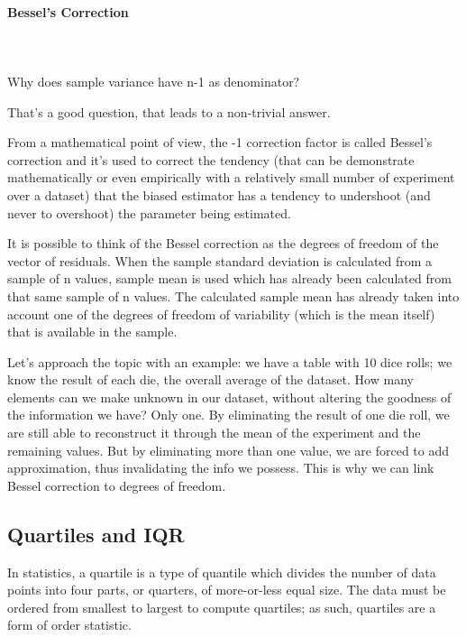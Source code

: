 \documentclass{article}
\begin{document}
\paragraph{Bessel's Correction}\mbox{} \\ 
\mbox{} \\

Why does sample variance have n-1 as denominator?

That’s a good question, that leads to a non-trivial answer. 

From a mathematical point of view, the -1 correction factor is called Bessel’s correction and it’s used to correct the tendency (that can be demonstrate mathematically or even empirically with a relatively small number of experiment over a dataset) that the biased estimator has a tendency to undershoot (and never to overshoot) the parameter being estimated.  

It is possible to think of the Bessel correction as the degrees of freedom of the vector of residuals. When the sample standard deviation is calculated from a sample of n values, sample mean is used which has already been calculated from that same sample of n values. The calculated sample mean has already taken into account one of the degrees of freedom of variability (which is the mean itself) that is available in the sample.

Let's approach the topic with an example: we have a table with 10 dice rolls; we know the result of each die, the overall average of the dataset.
How many elements can we make unknown in our dataset, without altering the goodness of the information we have?
Only one. By eliminating the result of one die roll, we are still able to reconstruct it through the mean of the experiment and the remaining values.
But by eliminating more than one value, we are forced to add approximation, thus invalidating the info we possess.
This is why we can link Bessel correction to degrees of freedom. 

\subsection{Quartiles and IQR}
In statistics, a quartile is a type of quantile which divides the number of data points into four parts, or quarters, of more-or-less equal size. The data must be ordered from smallest to largest to compute quartiles; as such, quartiles are a form of order statistic. 
\end{document}
